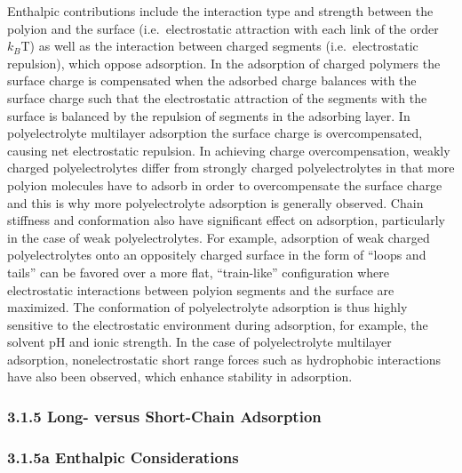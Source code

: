 \documentclass[journal=mamobx,manuscript=article]{achemso}
\begin{document}
Enthalpic contributions include the interaction type and strength between the polyion and the surface (i.e.\ electrostatic attraction with each link of the order $k_B$T) as well as the interaction between charged segments (i.e.\ electrostatic repulsion), which oppose adsorption.\cite{Hoogeveen1996,VonGoeler1994}  In the adsorption of charged polymers the surface charge is compensated when the adsorbed charge balances with the surface charge such that the electrostatic attraction of the segments with the surface is balanced by the repulsion of segments in the adsorbing layer.  In polyelectrolyte multilayer adsorption the surface charge is overcompensated, causing net electrostatic repulsion.  In achieving charge overcompensation, weakly charged polyelectrolytes differ from strongly charged polyelectrolytes in that more polyion molecules have to adsorb in order to overcompensate the surface charge and this is why more polyelectrolyte adsorption is generally observed.  Chain stiffness and conformation also have significant effect on adsorption, particularly in the case of weak polyelectrolytes.\cite{Dzubiella2003}  For example, adsorption of weak charged polyelectrolytes onto an oppositely charged surface in the form of “loops and tails” can be favored over a more flat, “train-like” configuration where electrostatic interactions between polyion segments and the surface are maximized. \cite{Borisov1994}  The conformation of polyelectrolyte adsorption is thus highly sensitive to the electrostatic environment during adsorption, for example, the solvent pH and ionic strength.\cite{Notley2004}  In the case of polyelectrolyte multilayer adsorption, nonelectrostatic short range forces such as hydrophobic interactions have also been observed, which enhance stability in adsorption.\cite{Kotov1999}  


\subsubsection{3.1.5 Long- versus Short-Chain Adsorption }  %
  \label{sec-longvsshort}

\subsubsection{3.1.5a Enthalpic Considerations}  %
    \label{sec-enthalpic}
\end{document}
